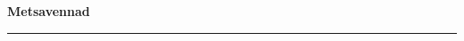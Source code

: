 \documentclass[10pt]{book}
\begin{document}
{
  \samepage
  \raggedbottom
  \raggedright
  \sloppy


  \vspace{0.2in}

  \noindent\begin{minipage}{.1\textwidth}
    \hfill\vspace{0.1in}
  \end{minipage}%
  \noindent\begin{minipage}{.8\textwidth}
    \centering
    \bfseries
    \large Metsavennad
  \end{minipage}%
  \noindent\begin{minipage}{.1\textwidth}
      \hfill\vspace{0.1in}
  \end{minipage}

  \nopagebreak[4]
  \vspace{0.1in}
  \nopagebreak[4]
  \hrule height 0.05ex
  \nopagebreak[4]
  \vspace{-0.05in}




}
\end{document}
